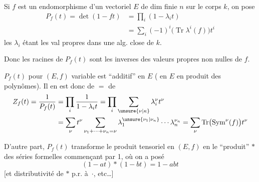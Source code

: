Si $f$ est un endomorphisme d'un vectoriel $E$ de dim finie $n$ sur le corps $k$, on pose
\[
\begin{aligned}
P_f(t)=\det(1-ft)&=\prod_i(1-\lambda_i t)\\
&=\sum_i(-1)^i\bigl(\operatorname{Tr}\lambda^i(f)\bigr)t^i
\end{aligned}
\]
les $\lambda_i$ étant les val propres dans une  alg. close de $k$.

Donc les racines de $P_f(t)$ sont les inverses des valeurs propres non nulles de $f$.

$P_f(t)$ pour $(E,f)$ variable est ``additif'' en $E$ ( en $E$  en produit des polynômes). Il en est donc de $=$ de
\[
\begin{aligned}
Z_f(t)=\frac{1}{P_f(t)}
 &=\prod_i\frac{1}{1-\lambda_i t}
 =\prod_i\sum_{\unsure{\nu|\kappa}}\lambda_i^\nu t^\nu\\
 &=\sum_\nu t^\nu\sum_{\nu_1+\cdots+\nu_n=\nu}\lambda_1^{\unsure{\nu_1|\nu_n}}\cdots\lambda_n^{\nu_n}
 =\sum_\nu\operatorname{Tr}\bigl(\operatorname{Sym}^\nu(f)\bigr)t^\nu
\end{aligned}
\]

D'autre part, $P_f(t)$ transforme le produit tensoriel en $(E,f)$ en le ``produit'' $\ast$ des séries formelles commençant par 1, où on a posé
\[
(1-at)\ast(1-bt)=1-abt
\]
[et distributivité de $\ast$ p.r. à\ $\cdot$, etc\ldots]

